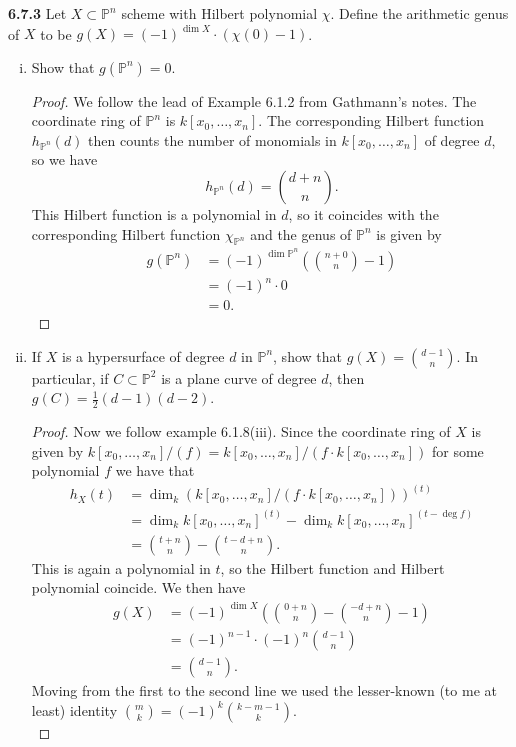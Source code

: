 \documentclass[11pt,letterpaper]{report}
\newcommand{\projective}{\mathbb{P}}
\begin{document}
\noindent\textbf{6.7.3}
Let $X\subset \projective^n$ scheme with Hilbert polynomial $\chi$. Define the arithmetic genus of $X$ to be $g(X) = (-1)^{\dim X}\cdot (\chi(0)-1)$.
\begin{enumerate}[(i)]
	\item Show that $g(\projective^n) = 0$.
	\begin{proof}
		We follow the lead of Example 6.1.2 from Gathmann's notes. The coordinate ring of $\projective^n$ is $k[x_0, \ldots, x_n]$. The corresponding Hilbert function $h_{\projective^n}(d)$ then counts the number of monomials in $k[x_0, \ldots, x_n]$ of degree $d$, so we have
		\[
		h_{\projective^n}(d) = \binom{d+n}{n}.
		\]
		This Hilbert function is a polynomial in $d$, so it coincides with the corresponding Hilbert function $\chi_{\projective^n}$ and the genus of $\projective^n$ is given by
		\begin{align*}
			g(\projective^n) &= (-1)^{\dim \projective^n}\left(\binom{n+0}{n} - 1\right)\\
			&= (-1)^n\cdot 0\\
			&= 0.
		\end{align*}
	\end{proof}
	\item If $X$ is a hypersurface of degree $d$ in $\projective^n$, show that $g(X) = \binom{d-1}{n}$. In particular, if $C\subset \projective^2$ is a plane curve of degree $d$, then $g(C) = \frac{1}{2}(d-1)(d-2)$.
	\begin{proof}
		Now we follow example 6.1.8(iii). Since the coordinate ring of $X$ is given by $k[x_0, \ldots, x_n]/(f) = k[x_0, \ldots, x_n]/(f\cdot k[x_0, \ldots, x_n])$ for some polynomial $f$ we have that
		\begin{align*}
			h_X(t) &= \dim_k(k[x_0, \ldots, x_n]/(f\cdot k[x_0, \ldots, x_n]))^{(t)}\\
			&= \dim_k k[x_0, \ldots, x_n]^{(t)} - \dim_kk[x_0, \ldots, x_n]^{(t-\deg f)}\\
			&= \binom{t+n}{n} - \binom{t-d+n}{n}.
		\end{align*}
		This is again a polynomial in $t$, so the Hilbert function and Hilbert polynomial coincide. We then have
		\begin{align*}
			g(X) &= (-1)^{\dim X}\left(\binom{0+n}{n} - \binom{-d+n}{n}-1\right)\\
			&= (-1)^{n-1}\cdot (-1)^n\binom{d-1}{n}\\
			&= \binom{d-1}{n}.
		\end{align*}
		Moving from the first to the second line we used the lesser-known (to me at least) identity $\binom{m}{k} = (-1)^k\binom{k-m-1}{k}$.\\


\end{proof}
\end{enumerate}
\end{document}
